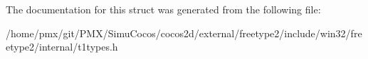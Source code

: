 The documentation for this struct was generated from the following file\+:\begin{DoxyCompactItemize}
\item 
/home/pmx/git/\+P\+M\+X/\+Simu\+Cocos/cocos2d/external/freetype2/include/win32/freetype2/internal/t1types.\+h\end{DoxyCompactItemize}
